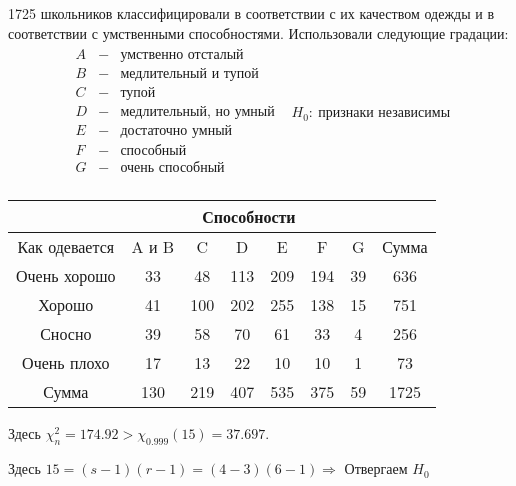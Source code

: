 \begin{example}
    1725 школьников классифицировали в соответствии с их
    качеством одежды и в соответствии с умственными способностями.
    Использовали следующие градации:
    \[
    \begin{array}{lr}
        \begin{array}{lcl}
            A &-& \text{умственно отсталый} \\
            B &-& \text{медлительный и тупой} \\
            C &-& \text{тупой} \\
            D &-& \text{медлительный, но умный} \\
            E &-& \text{достаточно умный} \\
            F &-& \text{способный} \\
            G &-& \text{очень способный} \\
        \end{array} & 
        \boxed{H_0:\ \text{признаки независимы}}
    \end{array}
    \]
    \begin{table}[h]
        \centering
        \begin{tabular}{ c|c|c|c|c|c|c|c }
            & \multicolumn{6}{|c|}{Способности} & \\ \hline
            Как одевается & A и B & C   & D   & E   & F   & G  & Сумма \\ \hline
            Очень хорошо  &  33   & 48  & 113 & 209 & 194 & 39 & 636   \\ \hline
            Хорошо        &  41   & 100 & 202 & 255 & 138 & 15 & 751   \\ \hline
            Сносно        &  39   & 58  & 70  & 61  & 33  & 4  & 256   \\ \hline
            Очень плохо   &  17   & 13  & 22  & 10  & 10  & 1  & 73    \\ \hline
            Сумма         &  130  & 219 & 407 & 535 & 375 & 59 & 1725
        \end{tabular}
    \end{table}

    Здесь $\chi_n^2=174.92>\chi_{0.999}(15)=37.697$. \par
    Здесь $15 = (s-1)(r-1) = (4-3)(6-1) \Rightarrow$ Отвергаем $H_0$
\end{example}
